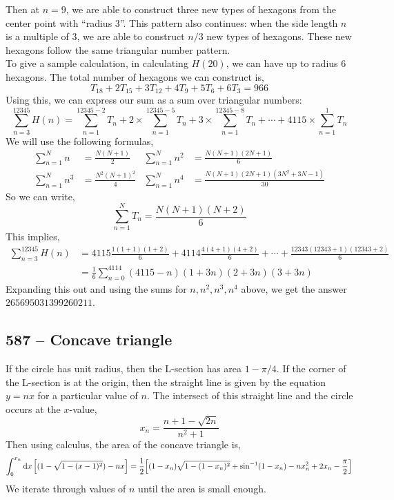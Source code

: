\documentclass{article}
\begin{document}
Then at $n=9$, we are able to construct three new types of hexagons from the center point with ``radius 3''.
This pattern also continues: when the side length $n$ is a multiple of 3, we are able to construct $n/3$ new types of hexagons.
These new hexagons follow the same triangular number pattern. \\

To give a sample calculation, in calculating $H(20)$, we can have up to radius 6 hexagons.
The total number of hexagons we can construct is,
\[ T_{18} + 2T_{15} + 3 T_{12} + 4 T_{9} + 5 T_{6} + 6 T_{3} = 966 \]
Using this, we can express our sum as a sum over triangular numbers:
\[ \sum_{n=3}^{12345} H(n) = \sum_{n=1}^{12345-2} T_n + 2\times \sum_{n=1}^{12345-5}T_n + 3 \times \sum_{n=1}^{12345-8} T_n + \cdots + 4115 \times \sum_{n=1}^1 T_n \]
We will use the following formulas,
\begin{align*}
\sum_{n=1}^N n &= \frac{N(N+1)}{2} & \sum_{n=1}^N n^2 &= \frac{N(N+1)(2N+1)}{6} \\
\sum_{n=1}^N n^3 &= \frac{N^2 (N+1)^2}{4} & \sum_{n=1}^N n^4 &= \frac{N(N+1)(2N+1)(3N^2 + 3N - 1)}{30}
\end{align*}
So we can write,
\[ \sum_{n=1}^N T_n = \frac{N(N+1)(N+2)}{6} \]
This implies,
\begin{align*}
\sum_{n=3}^{12345} H(n) &= 4115 \frac{1(1+1)(1+2)}{6} + 4114 \frac{4(4+1)(4+2)}{6} + \cdots +\frac{12343(12343+1)(12343+2)}{6} \\
&= \frac{1}{6} \sum_{n=0}^{4114} (4115-n)(1+3n)(2+3n)(3+3n)
\end{align*}
Expanding this out and using the sums for $n, n^2, n^3, n^4$ above, we get the answer $\boxed{ 265695031399260211} $.

\subsection*{587 -- Concave triangle}
If the circle has unit radius, then the L-section has area $1 - \pi/4$.
If the corner of the L-section is at the origin, then the straight line is given by the equation $y = nx$ for a particular value of $n$.
The intersect of this straight line and the circle occurs at the $x$-value,
\[ x_n = \frac{n+1-\sqrt{2n}}{n^2+1} \]
Then using calculus, the area of the concave triangle is,
\[ \int_0^{x_n} \dd{x} \qty[(1 - \sqrt{1 - (x-1)^2}) - nx]  = \frac{1}{2} \qty[ (1-x_n) \sqrt{1 - (1 - x_n)^2} + \sin^{-1}(1-x_n) - nx_n^2 + 2x_n - \frac{\pi}{2} ] \]
We iterate through values of $n$ until the area is small enough.
\end{document}
